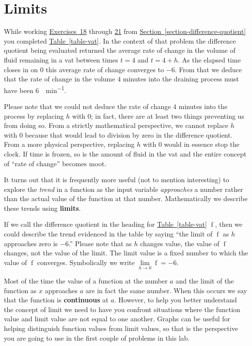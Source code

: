 \documentclass[12pt,]{book}
\newcommand{\terminology}[1]{\textbf{#1}}
\theoremstyle{plain}
\theoremstyle{definition}
\numberwithin{equation}{section}
\newcommand{\fe}[2]{\mathop{{#1}{\left(#2\right)}}}
\begin{document}
\section[Limits]{Limits}\label{section-limits}
While working \hyperref[exercise-vat-first]{Exercises~18} through \hyperref[exercise-vat-last]{21} from \hyperref[section-difference-quotient]{Section~\ref*{section-difference-quotient}} you completed \hyperref[table-vat]{Table~\ref*{table-vat}}. In the context of that problem the difference quotient being evaluated returned the average rate of change in the volume of fluid remaining in a vat between times \(t=4\) and \(t=4+h\). As the elapsed time closes in on \(0\) this average rate of change converges to \(-6\). From that we deduce that the rate of change in the volume \(4\) minutes into the draining process must have been \SI{6}{\gallon\per\minute}.%
\par
Please note that we could not deduce the rate of change \(4\) minutes into the process by replacing \(h\) with \(0\); in fact, there are at least two things preventing us from doing so. From a strictly mathematical perspective, we cannot replace \(h\) with \(0\) because that would lead to division by zero in the difference quotient. From a more physical perspective, replacing \(h\) with \(0\) would in essence stop the clock. If time is frozen, so is the amount of fluid in the vat and the entire concept of ``rate of change'' becomes moot.%
\par
It turns out that it is frequently more useful (not to mention interesting) to explore the \emph{trend} in a function as the input variable \emph{approaches} a number rather than the actual value of the function at that number. Mathematically we describe these trends using \terminology{limits}.%
\par
If we call the difference quotient in the heading for \hyperref[table-vat]{Table~\ref*{table-vat}} \(\fe{f}{h}\), then we could describe the trend evidenced in the table by saying ``the limit of \(\fe{f}{h}\) as \(h\) approaches zero is \(-6\).'' Please note that as \(h\) changes value, the value of \(\fe{f}{h}\) changes, not the value of the limit. The limit value is a fixed number to which the value of \(\fe{f}{h}\) converges. Symbolically we write \(\lim\limits_{h\to0}\fe{f}{h}=-6\).%
\par
Most of the time the value of a function at the number \(a\) and the limit of the function as \(x\) approaches \(a\) are in fact the same number. When this occurs we say that the function is \terminology{continuous} at \(a\). However, to help you better understand the concept of limit we need to have you confront situations where the function value and limit value are not equal to one another. Graphs can be useful for helping distinguish function values from limit values, so that is the perspective you are going to use in the first couple of problems in this lab.%
\typeout{************************************************}
\typeout{************************************************}
\end{document}
